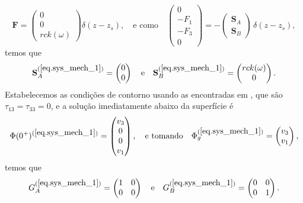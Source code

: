 \begin{equation*}
\mathbf{F}=\begin{pmatrix}
0\\
0\\
rck(\omega)
\end{pmatrix}\delta(z-z_s),\quad\text{e como}\quad
\begin{pmatrix}
0\\
-F_1\\
-F_3\\
0
\end{pmatrix}
=-
\begin{pmatrix}
\mathbf{S}_A\\
\mathbf{S}_B
\end{pmatrix}\,\delta(z-z_s),
\end{equation*}
temos que
\begin{equation*}
\mathbf{S}_A^{(\ref{eq.sys_mech_1})}=\begin{pmatrix}
0\\
0
\end{pmatrix}\quad\text{e}\quad
\mathbf{S}_B^{(\ref{eq.sys_mech_1})}=\begin{pmatrix}
rck(\omega)\\
0
\end{pmatrix}.
\end{equation*}
Estabelecemos as condi\c{c}\~oes de contorno usando as encontradas em \cite{pride_94}, que s\~ao $\tau_{13}=\tau_{33}=0$, e a solu\c{c}\~ao imediatamente abaixo da superf\'icie \'e
\begin{equation*}
\Phi(0^+)^{(\ref{eq.sys_mech_1})}=\begin{pmatrix}
v_3\\
0\\
0\\
v_1
\end{pmatrix},\quad\text{e tomando}\quad
\Phi_g^{(\ref{eq.sys_mech_1})}=\begin{pmatrix}
v_3\\
v_1
\end{pmatrix},
\end{equation*}
temos que
\begin{equation*}
G_A^{(\ref{eq.sys_mech_1})}=\begin{pmatrix}
1&0\\
0&0
\end{pmatrix}\quad\text{e}\quad
G_B^{(\ref{eq.sys_mech_1})}=\begin{pmatrix}
0&0\\
0&1
\end{pmatrix}.
\end{equation*}

